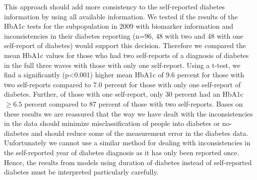 \documentclass[12pt,english,british]{article}
\begin{document}
This approach should add more consistency to the self-reported diabetes
information by using all available information. We tested if the results
of the \ac{HbA1c} tests for the subpopulation in 2009 with biomarker
information and inconsistencies in their diabetes reporting (n=96,
48 with two and 48 with one self-report of diabetes) would support
this decision. Therefore we compared the mean \ac{HbA1c} values for those
who had two self-reports of a diagnosis of diabetes in the full three
waves with those with only one self-report. Using a t-test, we find
a significantly (p<0.001) higher mean \ac{HbA1c} of 9.6 percent
for those with two self-reports compared to 7.0 percent for those
with only one self-report of diabetes. Further, of those with one
self-report, only 30 percent had an \ac{HbA1c}$\geq6.5$ percent
compared to 87 percent of those with two self-reports. Bases on these results we are reassured that the way we have dealt with the inconsistencies in the data should
minimize misclassification of people into diabetes or no-diabetes
and should reduce some of the measurement error in the diabetes data. Unfortunately we cannot use a similar method for dealing with inconsistencies
in the self-reported year of diabetes diagnosis as it has only been reported once. Hence, the results from models using
duration of diabetes instead of self-reported diabetes must be interpreted
particularly carefully.
\end{document}
